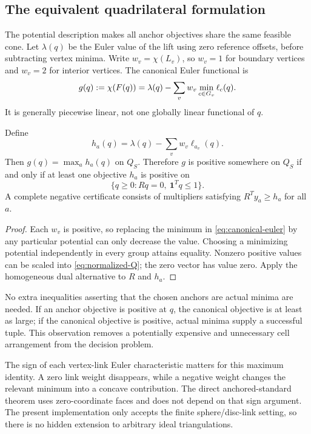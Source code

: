 \subsection{The equivalent quadrilateral formulation}

The potential description makes all anchor objectives share the same feasible cone. Let $\lambda(q)$ be the Euler value of the lift using zero reference offsets, before subtracting vertex minima. Write $w_v=\chi(L_v)$, so $w_v=1$ for boundary vertices and $w_v=2$ for interior vertices. The canonical Euler functional is
\begin{equation}\label{eq:canonical-euler}
 g(q):=\chi(F(q))=\lambda(q)-\sum_v w_v\min_{c\in G_v}\ell_c(q).
\end{equation}
It is generally piecewise linear, not one globally linear functional of $q$.

\begin{theorem}\label{thm:max-objectives}
Define
\[
 h_a(q)=\lambda(q)-\sum_v w_v\ell_{a_v}(q).
\]
Then $g(q)=\max_a h_a(q)$ on $Q_S$. Therefore $g$ is positive somewhere on $Q_S$ if and only if at least one objective $h_a$ is positive on
\begin{equation}\label{eq:normalized-Q}
 \{q\ge0:Rq=0,\ \mathbf1^Tq\le1\}.
\end{equation}
A complete negative certificate consists of multipliers satisfying $R^Ty_a\ge h_a$ for all $a$.
\end{theorem}
\begin{proof}
Each $w_v$ is positive, so replacing the minimum in \eqref{eq:canonical-euler} by any particular potential can only decrease the value. Choosing a minimizing potential independently in every group attains equality. Nonzero positive values can be scaled into \eqref{eq:normalized-Q}; the zero vector has value zero. Apply the homogeneous dual alternative to $R$ and $h_a$.
\end{proof}

No extra inequalities asserting that the chosen anchors are actual minima are needed. If an anchor objective is positive at $q$, the canonical objective is at least as large; if the canonical objective is positive, actual minima supply a successful tuple. This observation removes a potentially expensive and unnecessary cell arrangement from the decision problem.

The sign of each vertex-link Euler characteristic matters for this maximum identity. A zero link weight disappears, while a negative weight changes the relevant minimum into a concave contribution. The direct anchored-standard theorem uses zero-coordinate faces and does not depend on that sign argument. The present implementation only accepts the finite sphere/disc-link setting, so there is no hidden extension to arbitrary ideal triangulations.

